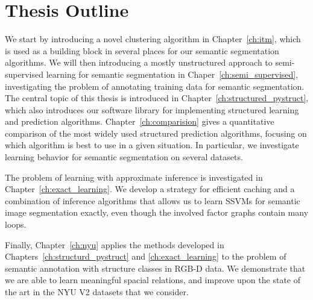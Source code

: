\section{Thesis Outline}
We start by introducing a novel clustering algorithm in Chapter~\ref{ch:itm}, which is used as a building
block in several places for our semantic segmentation algorithms.
We will then introducing a mostly unstructured approach to semi-supervised learning for semantic segmentation in Chaper~\ref{ch:semi_supervised},
investigating the problem of annotating training data for semantic segmentation.
The central topic of this thesis is introduced in Chapter~\ref{ch:structured_pystruct}, which also introduces our software library
for implementing structured learning and prediction algorithms.
Chapter~\ref{ch:comparision} gives a quantitative comparison of the most widely used structured prediction algorithms, focusing on
which algorithm is best to use in a given situation. In particular, we investigate learning behavior for semantic segmentation on several datasets.

The problem of learning with approximate inference is investigated in Chapter~\ref{ch:exact_learning}.
We develop a strategy for efficient caching and a combination of inference algorithms that allows us to
learn SSVMs for semantic image segmentation exactly, even though the involved factor graphs contain many loops.

Finally, Chapter~\ref{ch:nyu} applies the methods developed in Chapters~\ref{ch:structurd_pystruct} and \ref{ch:exact_learning}
to the problem of semantic annotation with structure classes in RGB-D data. We demonstrate that we are able to learn
meaningful spacial relations, and improve upon the state of the art in the NYU V2 datasets that we consider.

